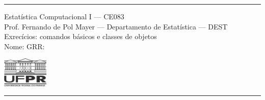 \documentclass[a4paper,11pt,fleqn]{article}\usepackage[]{graphicx}\usepackage[]{color}
\theoremstyle{definition}
\begin{document}
\reversemarginpar %





\hrule
\vspace{0.3cm}



\begin{minipage}[c]{.85\textwidth}
  Estatística Computacional I --- CE083 \\
  Prof. Fernando de Pol Mayer --- Departamento de Estatística --- DEST \\
  Exrecícios: comandos básicos e classes de objetos \\
  Nome:  \hfill GRR: \hspace{2cm}
\end{minipage}\hfill
\begin{minipage}[c]{.15\textwidth}
\flushright
\includegraphics[width=2.2cm]{../img/ufpr-logo2.jpg}
\end{minipage}

\vspace{0.3cm}
\hrule
\vspace{0.3cm}

\end{document}

